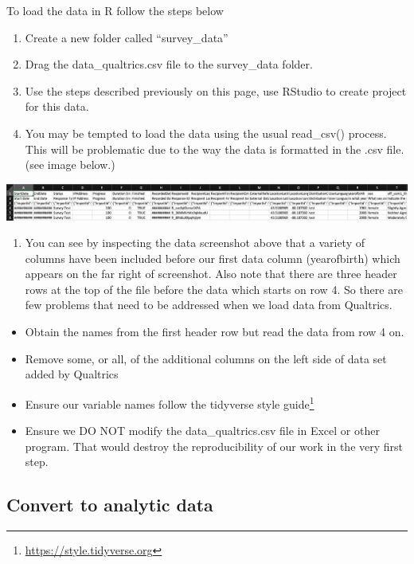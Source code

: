 \documentclass[
]{krantz}
\providecommand{\tightlist}{%
  \setlength{\itemsep}{0pt}\setlength{\parskip}{0pt}}
\renewcommand{\href}[2]{#2\footnote{\url{#1}}}
\begin{document}
To load the data in R follow the steps below

\begin{enumerate}
\def\labelenumi{\arabic{enumi}.}
\item
  Create a new folder called ``survey\_data''
\item
  Drag the data\_qualtrics.csv file to the survey\_data folder.
\item
  Use the steps described previously on this page, use RStudio to create project for this data.
\item
  You may be tempted to load the data using the usual read\_csv() process. This will be problematic due to the way the data is formatted in the .csv file. (see image below.)
\end{enumerate}

\includegraphics[width=1\linewidth]{ch_qualtrics/images/screenshot_raw_data}

\begin{enumerate}
\def\labelenumi{\arabic{enumi}.}
\setcounter{enumi}{4}
\tightlist
\item
  You can see by inspecting the data screenshot above that a variety of columns have been included before our first data column (yearofbirth) which appears on the far right of screenshot. Also note that there are three header rows at the top of the file before the data which starts on row 4. So there are few problems that need to be addressed when we load data from Qualtrics.
\end{enumerate}

\begin{itemize}
\item
  Obtain the names from the first header row but read the data from row 4 on.
\item
  Remove some, or all, of the additional columns on the left side of data set added by Qualtrics
\item
  Ensure our variable names follow the tidyverse \href{https://style.tidyverse.org}{style guide}
\item
  Ensure we DO NOT modify the data\_qualtrics.csv file in Excel or other program. That would destroy the reproducibility of our work in the very first step.
\end{itemize}

\hypertarget{convert-to-analytic-data}{%
\subsection{Convert to analytic data}\label{convert-to-analytic-data}}
\end{document}
